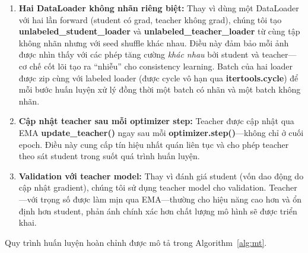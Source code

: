 \documentclass[conference]{IEEEtran}
\begin{document}
\begin{enumerate}
    \item \textbf{Hai DataLoader không nhãn riêng biệt:} Thay vì dùng một DataLoader với hai lần forward (student có grad, teacher không grad), chúng tôi tạo \textbf{unlabeled\_student\_loader} và \textbf{unlabeled\_teacher\_loader} từ cùng tập không nhãn nhưng với seed shuffle khác nhau. Điều này đảm bảo mỗi ảnh được nhìn thấy với các phép tăng cường \textit{khác nhau} bởi student và teacher---cơ chế cốt lõi tạo ra ``nhiễu'' cho consistency learning. Batch của hai loader được zip cùng với labeled loader (được cycle vô hạn qua \textbf{itertools.cycle}) để mỗi bước huấn luyện xử lý đồng thời một batch có nhãn và một batch không nhãn.

    \item \textbf{Cập nhật teacher sau mỗi optimizer step:} Teacher được cập nhật qua EMA \textbf{update\_teacher()} ngay sau mỗi \textbf{optimizer.step()}---không chỉ ở cuối epoch. Điều này cung cấp tín hiệu nhất quán liên tục và cho phép teacher theo sát student trong suốt quá trình huấn luyện.

    \item \textbf{Validation với teacher model:} Thay vì đánh giá student (vốn dao động do cập nhật gradient), chúng tôi sử dụng teacher model cho validation. Teacher---với trọng số được làm mịn qua EMA---thường cho hiệu năng cao hơn và ổn định hơn student, phản ánh chính xác hơn chất lượng mô hình sẽ được triển khai.
\end{enumerate}

Quy trình huấn luyện hoàn chỉnh được mô tả trong Algorithm~\ref{alg:mt}.
\end{document}
